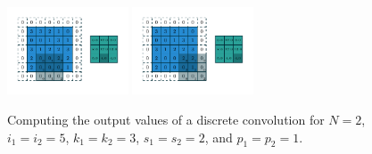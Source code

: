 \documentclass{report}
\begin{document}
\begin{figure}[p]
    \includegraphics[width=0.32\textwidth]{pdf/numerical_padding_strides_07.pdf}
    \includegraphics[width=0.32\textwidth]{pdf/numerical_padding_strides_08.pdf}
    \caption{\label{fig:numerical_padding_strides} Computing the output values
        of a discrete convolution for $N = 2$, $i_1 = i_2 = 5$, $k_1 = k_2 = 3$,
        $s_1 = s_2 = 2$, and $p_1 = p_2 = 1$.}
\end{figure}
\end{document}
